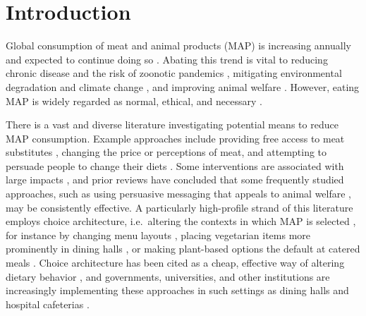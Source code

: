 \documentclass[sn-nature,referee,pdflatex]{sn-jnl}
\begin{document}



\maketitle

\section{Introduction}\label{sec1}

Global consumption of meat and animal products (MAP) is increasing
annually \citep{godfray2018} and expected to continue doing so
\citep{whitton2021}. Abating this trend is vital to reducing chronic
disease and the risk of zoonotic pandemics
\citep{willett2019, landry2023, hafez2020}, mitigating environmental
degradation and climate change
\citep{poore2018, koneswaran2008, greger2010}, and improving animal
welfare \citep{kuruc2023, scherer2019}. However, eating MAP is widely
regarded as normal, ethical, and necessary
\citep{piazza2022, milford2019}.

There is a vast and diverse literature investigating potential means to
reduce MAP consumption. Example approaches include providing free access
to meat substitutes \citep{katare2023}, changing the price
\citep{horgen2002} or perceptions \citep{kunst2016} of meat, and
attempting to persuade people to change their diets
\citep{bianchi2018conscious}. Some interventions are associated with
large impacts \citep{lentz2020, boronowsky2022, reinders2017}, and prior
reviews have concluded that some frequently studied approaches, such as
using persuasive messaging that appeals to animal welfare
\citep{mathur2021meta}, may be consistently effective. A particularly
high-profile strand of this literature employs choice architecture,
i.e.~altering the contexts in which MAP is selected
\citep{bianchi2018restructuring}, for instance by changing menu layouts
\citep{bacon2018, gravert2021}, placing vegetarian items more
prominently in dining halls \citep{ginn2024}, or making plant-based
options the default at catered meals \citep{hansen2021}. Choice
architecture has been cited as a cheap, effective way of altering
dietary behavior \citep{colgan2024}, and governments, universities, and
other institutions are increasingly implementing these approaches in
such settings as dining halls \citep{pollicino2024} and hospital
cafeterias \citep{morgenstern2024}.
\end{document}
